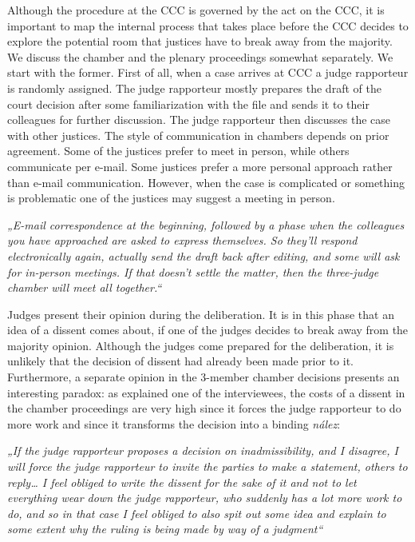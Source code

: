 \documentclass[
  11pt,
]{article}
\begin{document}
Although the procedure at the CCC is governed by the act on the CCC, it is important to map the internal process that takes place before the CCC decides to explore the potential room that justices have to break away from the majority. We discuss the chamber and the plenary proceedings somewhat separately. We start with the former. First of all, when a case arrives at CCC a judge rapporteur is randomly assigned. The judge rapporteur mostly prepares the draft of the court decision after some familiarization with the file and sends it to their colleagues for further discussion. The judge rapporteur then discusses the case with other justices. The style of communication in chambers depends on prior agreement. Some of the justices prefer to meet in person, while others communicate per e-mail. Some justices prefer a more personal approach rather than e-mail communication. However, when the case is complicated or something is problematic one of the justices may suggest a meeting in person.

\emph{„E-mail correspondence at the beginning, followed by a phase when the colleagues you have approached are asked to express themselves. So they'll respond electronically again, actually send the draft back after editing, and some will ask for in-person meetings. If that doesn't settle the matter, then the three-judge chamber will meet all together.``}

Judges present their opinion during the deliberation. It is in this phase that an idea of a dissent comes about, if one of the judges decides to break away from the majority opinion. Although the judges come prepared for the deliberation, it is unlikely that the decision of dissent had already been made prior to it. Furthermore, a separate opinion in the 3-member chamber decisions presents an interesting paradox: as explained one of the interviewees, the costs of a dissent in the chamber proceedings are very high since it forces the judge rapporteur to do more work and since it transforms the decision into a binding \emph{nález}:

\emph{„If the judge rapporteur proposes a decision on inadmissibility, and I disagree, I will force the judge rapporteur to invite the parties to make a statement, others to reply\ldots{} I feel obliged to write the dissent for the sake of it and not to let everything wear down the judge rapporteur, who suddenly has a lot more work to do, and so in that case I feel obliged to also spit out some idea and explain to some extent why the ruling is being made by way of a judgment``}
\end{document}
